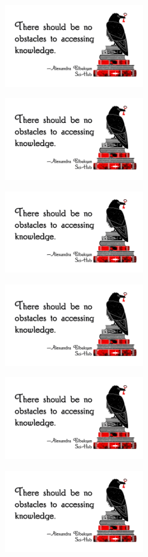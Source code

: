 \documentclass[a4paper,14pt]{extarticle}
\begin{document}

\parbox[c][34mm]{70mm}{\includegraphics[width=60mm]{obstacles-sticker} }
\parbox[c][34mm]{70mm}{\includegraphics[width=60mm]{obstacles-sticker} }
\parbox[c][34mm]{70mm}{\includegraphics[width=60mm]{obstacles-sticker} }

\vspace{2mm}


\parbox[c][34mm]{70mm}{\includegraphics[width=60mm]{obstacles-sticker} }
\parbox[c][34mm]{70mm}{\includegraphics[width=60mm]{obstacles-sticker} }
\parbox[c][34mm]{70mm}{\includegraphics[width=60mm]{obstacles-sticker} }
\end{document}
